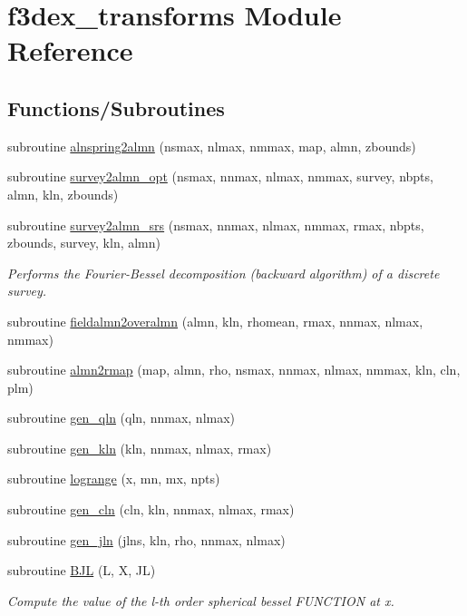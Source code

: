 \hypertarget{namespacef3dex__transforms}{
\section{f3dex\_\-transforms Module Reference}
\label{namespacef3dex__transforms}
}
\subsection*{Functions/Subroutines}
\begin{DoxyCompactItemize}
\item 
subroutine \hyperlink{namespacef3dex__transforms_aef309274871cf8eb0405b63f14ab26a2}{alnspring2almn} (nsmax, nlmax, nmmax, map, almn, zbounds)
\item 
subroutine \hyperlink{namespacef3dex__transforms_aa03041ae9480a0e4abc522b846a40cc8}{survey2almn\_\-opt} (nsmax, nnmax, nlmax, nmmax, survey, nbpts, almn, kln, zbounds)
\item 
subroutine \hyperlink{namespacef3dex__transforms_ae19f381573ccd64c64102bbd4181483f}{survey2almn\_\-srs} (nsmax, nnmax, nlmax, nmmax, rmax, nbpts, zbounds, survey, kln, almn)
\begin{DoxyCompactList}\small\item\em Performs the Fourier-\/Bessel decomposition (backward algorithm) of a discrete survey. \end{DoxyCompactList}\item 
subroutine \hyperlink{namespacef3dex__transforms_a4675d50d585b89b97772a0fa7dde4c5f}{fieldalmn2overalmn} (almn, kln, rhomean, rmax, nnmax, nlmax, nmmax)
\item 
subroutine \hyperlink{namespacef3dex__transforms_a3e792eb35f030b601d9262ac031cfdb9}{almn2rmap} (map, almn, rho, nsmax, nnmax, nlmax, nmmax, kln, cln, plm)
\item 
subroutine \hyperlink{namespacef3dex__transforms_a02b926f933d186f2c9d9ab6d478a1601}{gen\_\-qln} (qln, nnmax, nlmax)
\item 
subroutine \hyperlink{namespacef3dex__transforms_a4b80bc7cad52998fd0aff935a1695ee7}{gen\_\-kln} (kln, nnmax, nlmax, rmax)
\item 
subroutine \hyperlink{namespacef3dex__transforms_a2cd270ebc1186ae3872ab2e0068cff9d}{logrange} (x, mn, mx, npts)
\item 
subroutine \hyperlink{namespacef3dex__transforms_aa6cd797c56b97503bf2d52131f6e5554}{gen\_\-cln} (cln, kln, nnmax, nlmax, rmax)
\item 
subroutine \hyperlink{namespacef3dex__transforms_ad1ab102a8307876c7af8bd6868ea7ef2}{gen\_\-jln} (jlns, kln, rho, nnmax, nlmax)
\item 
subroutine \hyperlink{namespacef3dex__transforms_a9b68481c890d75c3e3f4cbd4a7109830}{BJL} (L, X, JL)
\begin{DoxyCompactList}\small\item\em Compute the value of the l-\/th order spherical bessel FUNCTION at x. \end{DoxyCompactList}\end{DoxyCompactItemize}
